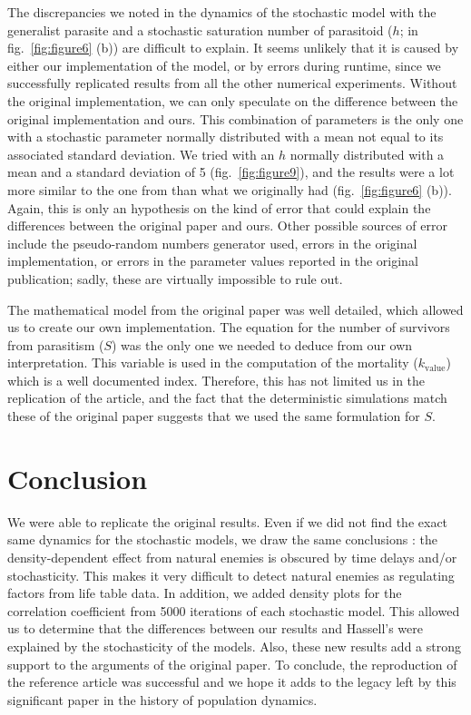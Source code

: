 \documentclass[10pt,a4paper,onecolumn]{article}
\begin{document}
The discrepancies we noted in the dynamics of the stochastic model with
the generalist parasite and a stochastic saturation number of parasitoid
(\(h\); in fig.~\ref{fig:figure6} (b)) are difficult to explain. It
seems unlikely that it is caused by either our implementation of the
model, or by errors during runtime, since we successfully replicated
results from all the other numerical experiments. Without the original
implementation, we can only speculate on the difference between the
original implementation and ours. This combination of parameters is the
only one with a stochastic parameter normally distributed with a mean
not equal to its associated standard deviation. We tried with an \(h\)
normally distributed with a mean and a standard deviation of 5
(fig.~\ref{fig:figure9}), and the results were a lot more similar to the
one from \textcite{Hassell85} than what we originally had
(fig.~\ref{fig:figure6} (b)). Again, this is only an hypothesis on the
kind of error that could explain the differences between the original
paper and ours. Other possible sources of error include the
pseudo-random numbers generator used, errors in the original
implementation, or errors in the parameter values reported in the
original publication; sadly, these are virtually impossible to rule out.

The mathematical model from the original paper was well detailed, which
allowed us to create our own implementation. The equation for the number
of survivors from parasitism (\(S\)) was the only one we needed to
deduce from our own interpretation. This variable is used in the
computation of the mortality (\(k_\text{value}\)) which is a well
documented index. Therefore, this has not limited us in the replication
of the article, and the fact that the deterministic simulations match
these of the original paper suggests that we used the same formulation
for \(S\).

\hypertarget{conclusion}{%
\section{Conclusion}\label{conclusion}}

We were able to replicate the original results. Even if we did not find
the exact same dynamics for the stochastic models, we draw the same
conclusions : the density-dependent effect from natural enemies is
obscured by time delays and/or stochasticity. This makes it very
difficult to detect natural enemies as regulating factors from life
table data. In addition, we added density plots for the correlation
coefficient from 5000 iterations of each stochastic model. This allowed
us to determine that the differences between our results and Hassell's
were explained by the stochasticity of the models. Also, these new
results add a strong support to the arguments of the original paper. To
conclude, the reproduction of the reference article \textcite{Hassell85}
was successful and we hope it adds to the legacy left by this
significant paper in the history of population dynamics.
\end{document}
